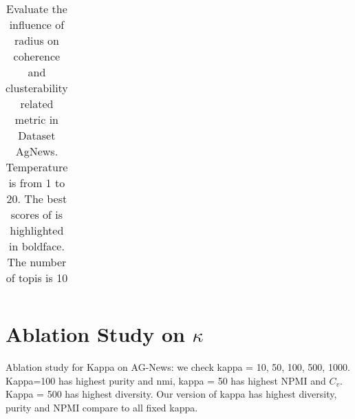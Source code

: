 \documentclass[11pt]{article}
\begin{document}
\begin{table}
\begin{tabular}{|r|r|r|r|r|r|r|}
\end{tabular}
\caption{\label{temperature} Evaluate the influence of radius on coherence and clusterability related metric in Dataset AgNews. Temperature is from 1 to 20.  The best scores of is highlighted in boldface. The number of topis is 10}

\end{table}

\section{Ablation Study on $\kappa$}
\label{kappas}

Ablation study for Kappa on AG-News: we check kappa = 10, 50, 100, 500, 1000. Kappa=100 has highest purity and nmi, kappa = 50 has highest NPMI and $C_v$. Kappa = 500 has highest diversity. Our version of kappa has highest diversity, purity and NPMI compare to all fixed kappa. 
\end{document}
